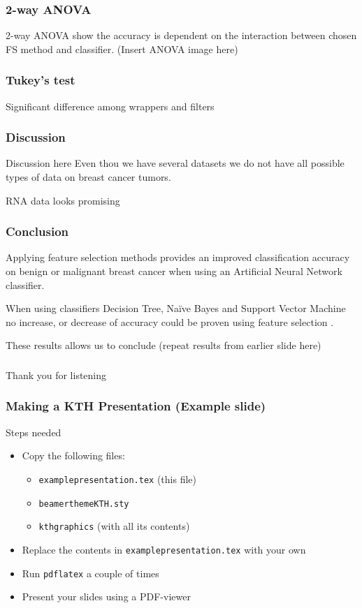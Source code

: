 \documentclass[aspectratio=1610]{beamer}
\begin{document}
\begin{frame}
  \frametitle{\hfill 2-way ANOVA}

  2-way ANOVA show the accuracy is dependent on the interaction between chosen FS method and classifier.
  (Insert ANOVA image here)
\end{frame}

\begin{frame}
  \frametitle{\hfill Tukey's test}
  Significant difference among wrappers and filters
\end{frame}

\begin{frame}
  \frametitle{\hfill Discussion}
  Discussion here
  Even thou we have several datasets we do not have all possible types of data on breast cancer tumors.

  RNA data looks promising

\end{frame}

\begin{frame}
  \frametitle{\hfill Conclusion}

  Applying feature selection methods provides an improved classification accuracy on benign or malignant breast cancer when using an Artificial Neural Network classifier. \pause

  When using classifiers Decision Tree, Na\"ive Bayes and Support Vector Machine no increase, or decrease of accuracy could be proven using feature selection . 


  These results allows us to conclude (repeat results from earlier slide here)
\end{frame}

\begin{frame}
  \frametitle{\hfill }
  Thank you for listening
\end{frame}



\begin{frame}
  \frametitle{\hfill Making a KTH Presentation (Example slide)}

  \begin{block}{Steps needed}
    \begin{itemize}
    \item Copy the following files:
    \begin{itemize}
    \item \texttt{examplepresentation.tex} (this file)
    \item \texttt{beamerthemeKTH.sty}
    \item \texttt{kthgraphics} (with all its contents)
    \end{itemize}
    \item Replace the contents in \texttt{examplepresentation.tex} with your own
    \item Run \texttt{pdflatex} a couple of times
    \item Present your slides using a PDF-viewer
    \end{itemize}
  \end{block}

\end{frame}
\end{document}
